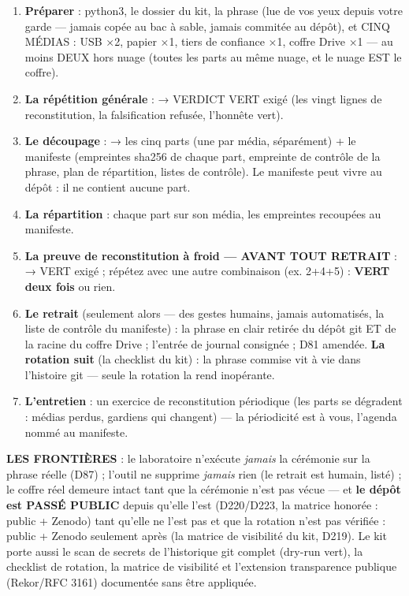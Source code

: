 \begin{enumerate}
\item \textbf{Préparer} : python3, le dossier du kit, la phrase (lue de vos
yeux depuis votre garde — jamais copée au bac à sable, jamais commitée au
dépôt), et CINQ MÉDIAS : USB ×2, papier ×1, tiers de confiance ×1,
coffre Drive ×1 — au moins DEUX hors nuage (toutes les parts au même
nuage, et le nuage EST le coffre).
\item \textbf{La répétition générale} :  → VERDICT VERT
exigé (les vingt lignes de reconstitution, la falsification refusée,
l'honnête vert).
\item \textbf{Le découpage} :  → les
cinq parts (une par média, séparément) + le manifeste (empreintes sha256
de chaque part, empreinte de contrôle de la phrase, plan de répartition,
listes de contrôle). Le manifeste peut vivre au dépôt : il ne contient
aucune part.
\item \textbf{La répartition} : chaque part sur son média, les empreintes
recoupées au manifeste.
\item \textbf{La preuve de reconstitution à froid — AVANT TOUT RETRAIT} :
 → VERT exigé ; répétez
avec une autre combinaison (ex. 2+4+5) : \textbf{VERT deux fois} ou rien.
\item \textbf{Le retrait} (seulement alors — des gestes humains, jamais
automatisés, la liste de contrôle du manifeste) : la phrase en clair
retirée du dépôt git ET de la racine du coffre Drive ; l'entrée de journal
consignée ; D81 amendée. \textbf{La rotation suit} (la checklist du kit) :
la phrase commise vit à vie dans l'histoire git — seule la rotation la
rend inopérante.
\item \textbf{L'entretien} : un exercice de reconstitution périodique (les
parts se dégradent : médias perdus, gardiens qui changent) — la périodicité
est à vous, l'agenda nommé au manifeste.
\end{enumerate}

\textbf{LES FRONTIÈRES} : le laboratoire n'exécute \emph{jamais} la
cérémonie sur la phrase réelle (D87) ; l'outil ne supprime \emph{jamais}
rien (le retrait est humain, listé) ; le coffre réel demeure intact tant
que la cérémonie n'est pas vécue — et \textbf{le dépôt est PASSÉ PUBLIC}
depuis qu'elle l'est (D220/D223, la matrice honorée : public + Zenodo)
tant qu'elle ne l'est pas et que la rotation n'est pas vérifiée : public +
Zenodo seulement après (la matrice de visibilité du kit, D219). Le kit
porte aussi le scan de secrets de l'historique git complet (dry-run vert),
la checklist de rotation, la matrice de visibilité et l'extension
transparence publique (Rekor/RFC 3161) documentée sans être appliquée.

